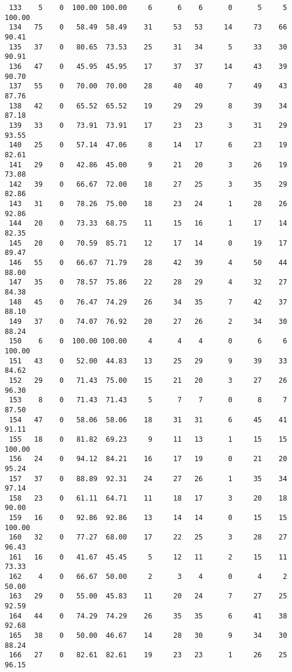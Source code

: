 \begin{verbatim}
 133    5    0  100.00 100.00     6      6    6      0      5     5   100.00
 134   75    0   58.49  58.49    31     53   53     14     73    66    90.41
 135   37    0   80.65  73.53    25     31   34      5     33    30    90.91
 136   47    0   45.95  45.95    17     37   37     14     43    39    90.70
 137   55    0   70.00  70.00    28     40   40      7     49    43    87.76
 138   42    0   65.52  65.52    19     29   29      8     39    34    87.18
 139   33    0   73.91  73.91    17     23   23      3     31    29    93.55
 140   25    0   57.14  47.06     8     14   17      6     23    19    82.61
 141   29    0   42.86  45.00     9     21   20      3     26    19    73.08
 142   39    0   66.67  72.00    18     27   25      3     35    29    82.86
 143   31    0   78.26  75.00    18     23   24      1     28    26    92.86
 144   20    0   73.33  68.75    11     15   16      1     17    14    82.35
 145   20    0   70.59  85.71    12     17   14      0     19    17    89.47
 146   55    0   66.67  71.79    28     42   39      4     50    44    88.00
 147   35    0   78.57  75.86    22     28   29      4     32    27    84.38
 148   45    0   76.47  74.29    26     34   35      7     42    37    88.10
 149   37    0   74.07  76.92    20     27   26      2     34    30    88.24
 150    6    0  100.00 100.00     4      4    4      0      6     6   100.00
 151   43    0   52.00  44.83    13     25   29      9     39    33    84.62
 152   29    0   71.43  75.00    15     21   20      3     27    26    96.30
 153    8    0   71.43  71.43     5      7    7      0      8     7    87.50
 154   47    0   58.06  58.06    18     31   31      6     45    41    91.11
 155   18    0   81.82  69.23     9     11   13      1     15    15   100.00
 156   24    0   94.12  84.21    16     17   19      0     21    20    95.24
 157   37    0   88.89  92.31    24     27   26      1     35    34    97.14
 158   23    0   61.11  64.71    11     18   17      3     20    18    90.00
 159   16    0   92.86  92.86    13     14   14      0     15    15   100.00
 160   32    0   77.27  68.00    17     22   25      3     28    27    96.43
 161   16    0   41.67  45.45     5     12   11      2     15    11    73.33
 162    4    0   66.67  50.00     2      3    4      0      4     2    50.00
 163   29    0   55.00  45.83    11     20   24      7     27    25    92.59
 164   44    0   74.29  74.29    26     35   35      6     41    38    92.68
 165   38    0   50.00  46.67    14     28   30      9     34    30    88.24
 166   27    0   82.61  82.61    19     23   23      1     26    25    96.15

\end{verbatim}
